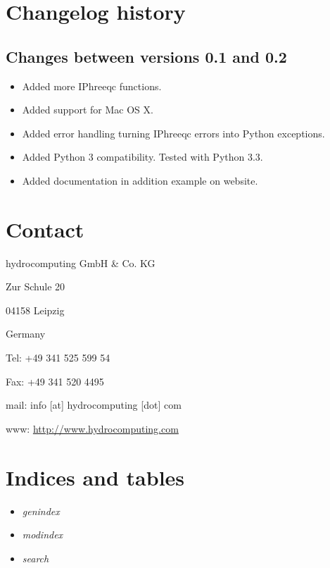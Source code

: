 \documentclass[letterpaper,10pt,english]{sphinxmanual}
\begin{document}
\chapter{Changelog history}
\label{changelog:changelog-history}\label{changelog::doc}\label{changelog:changelog}

\section{Changes between versions 0.1 and 0.2}
\label{changelog:changes-between-versions-0-1-and-0-2}\begin{itemize}
\item {} 
Added more IPhreeqc functions.

\item {} 
Added support for Mac OS X.

\item {} 
Added error handling turning IPhreeqc errors into Python exceptions.

\item {} 
Added Python 3 compatibility. Tested with Python 3.3.

\item {} 
Added documentation in addition example on website.

\end{itemize}


\chapter{Contact}
\label{contact:contact}\label{contact::doc}
\begin{DUlineblock}{0em}
\item[] hydrocomputing GmbH \& Co. KG
\item[] Zur Schule 20
\item[] 04158 Leipzig
\item[] Germany
\end{DUlineblock}

\begin{DUlineblock}{0em}
\item[] Tel: +49 341 525 599 54
\item[] Fax: +49 341 520 4495
\item[] mail: info {[}at{]} hydrocomputing {[}dot{]} com
\item[] www: \href{http://www.hydrocomputing.com}{http://www.hydrocomputing.com}
\end{DUlineblock}


\chapter{Indices and tables}
\label{contents:indices-and-tables}\begin{itemize}
\item {} 
\emph{genindex}

\item {} 
\emph{modindex}

\item {} 
\emph{search}

\end{itemize}



\renewcommand{\indexname}{Index}
\printindex
\end{document}
